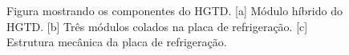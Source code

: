 \begin{figure}
    \centering    {}
    \caption{Figura mostrando os componentes do HGTD. [a] Módulo híbrido do HGTD. [b] Três módulos colados na placa de refrigeração. [c] Estrutura mecânica da placa de refrigeração.}
    \label{hgtd}
\end{figure}
\thispagestyle{plain}
\renewcommand{\cleardoublepage}{}
\renewcommand{\clearpage}{}